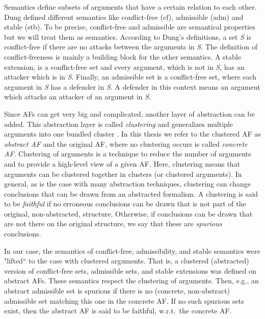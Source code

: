 Semantics define subsets of arguments that have a certain relation to each other. Dung defined different semantics \cite{Dung1995-DUNOTA-2} like conflict-free (cf), admissible (adm) and stable (stb). To be precise, conflict-free and admissible are semantical properties but we will treat them as semantics. According to Dung's definitions, a set \textit{S} is conflict-free if there are no attacks between the arguments in \textit{S}. The definition of conflict-freeness is mainly a building block for the other semantics.
A stable extension, is a conflict-free set and every argument, which is not in \textit{S}, has an attacker which is in \textit{S}.
Finally, an admissible set is a conflict-free set, where each argument in \textit{S} has a defender in \textit{S}. A defender in this context means an argument which attacks an attacker of an argument in \textit{S}.


Since AFs can get very big and complicated, another layer of abstraction can be added. This abstraction layer is called \emph{clustering} and generalizes multiple arguments into one bundled cluster \cite{DBLP:conf/kr/SaribaturW21}. In this thesis we refer to the clustered AF as \emph{abstract AF} and the original AF, where no clustering occurs is called \emph{concrete AF}.
Clustering of arguments is a technique to reduce the number of arguments and to provide a high-level view of a given AF. Here, clustering means that arguments can be clustered together in clusters (or clustered arguments). In general, as is the case with many abstraction techniques, clustering can change conclusions that can be drawn from an abstracted formalism. A clustering is said to be \emph{faithful} if no erroneous conclusions can be drawn that is not part of the original, non-abstracted, structure. Otherwise, if conclusions can be drawn that are not there on the original structure, we say that these are \emph{spurious} conclusions.

In our case, the semantics of conflict-free, admissibility, and stable semantics were "lifted`` to the case with clustered arguments. That is, a clustered (abstracted) version of conflict-free sets, admissible sets, and stable extensions was defined on abstract AFs. These semantics respect the clustering of arguments. Then, e.g., an abstract admissible set is spurious if there is no (concrete, non-abstract) admissible set matching this one in the concrete AF. If no such spurious sets exist, then the abstract AF is said to be faithful, w.r.t.\ the concrete AF.






